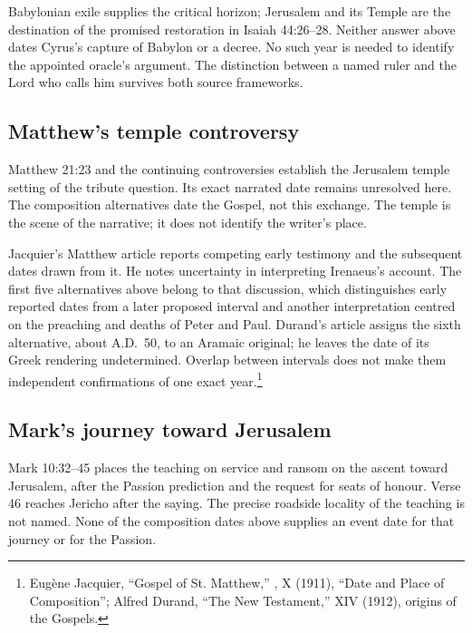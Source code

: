 Babylonian exile supplies the critical horizon; Jerusalem and its Temple are the destination of the promised restoration in Isaiah 44:26--28. Neither answer above dates Cyrus's capture of Babylon or a decree. No such year is needed to identify the appointed oracle's argument. The distinction between a named ruler and the Lord who calls him survives both source frameworks.

\subsection{Matthew's temple controversy}
\label{history-matthew}

Matthew 21:23 and the continuing controversies establish the Jerusalem temple setting of the tribute question. Its exact narrated date remains unresolved here. The composition alternatives date the Gospel, not this exchange. The temple is the scene of the narrative; it does not identify the writer's place.

Jacquier's Matthew article reports competing early testimony and the subsequent dates drawn from it. He notes uncertainty in interpreting Irenaeus's account. The first five alternatives above belong to that discussion, which distinguishes early reported dates from a later proposed interval and another interpretation centred on the preaching and deaths of Peter and Paul. Durand's  article assigns the sixth alternative, about A.D.\ 50, to an Aramaic original; he leaves the date of its Greek rendering undetermined. Overlap between intervals does not make them independent confirmations of one exact year.\footnote{Eugène Jacquier, ``Gospel of St. Matthew,'' , X (1911), ``Date and Place of Composition''; Alfred Durand, ``The New Testament,'' XIV (1912), origins of the Gospels.}

\subsection{Mark's journey toward Jerusalem}
\label{history-mark}

Mark 10:32--45 places the teaching on service and ransom on the ascent toward Jerusalem, after the Passion prediction and the request for seats of honour. Verse 46 reaches Jericho after the saying. The precise roadside locality of the teaching is not named. None of the composition dates above supplies an event date for that journey or for the Passion.

